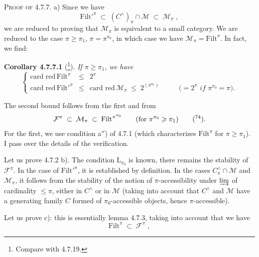 \documentclass[11pt]{article}
\newcommand{\msp}[1]{\marginpar{\footnotesize [#1]}}
\newcommand{\Filt}{\mathrm{Filt}}
\newcommand{\cardred}{\text{card red}\,}
\begin{document}
\textsc{Proof of} 4.7.7. a) Since we have
\[
\Filt'^{\pi} \;\subset\; (C^{\wedge})_{\pi} \cap \mathcal{M} \;\subset\; \mathcal{M}_{\pi} \;,
\]
we are reduced to proving that $\mathcal{M}_{\pi}$ is equivalent to a small category. We are reduced to the case $\pi \geqslant \pi_1$, $\pi = \pi^{\pi_0}$, in which case we have $\mathcal{M}_{\pi} = \Filt^{\pi}$. In fact, we find:

\textbf{Corollary 4.7.7.1} (\footnote[73]{Compare with 4.7.19.}). \textit{If $\pi \geqslant \pi_1$, we have}
\[
\left\{
\begin{array}{rcll}
\cardred \Filt^{\pi} & \leqslant & 2^{\pi} & \\[4pt]
\cardred \Filt'^{\pi} & \leqslant & \cardred \mathcal{M}_{\pi} \;\leqslant\; 2^{(\pi^{\pi_0})} & \qquad \textit{($= 2^{\pi}$ if $\pi^{\pi_0} = \pi$).}
\end{array}
\right.
\]

The second bound follows from the first and from
\[
\mathcal{F}^{\pi} \;\subset\; \mathcal{M}_{\pi} \;\subset\; \Filt^{\pi^{\pi_0}} \qquad (\text{for } \pi^{\pi_0} \geqslant \pi_1) \qquad \text{(\footnotemark[74]).}
\]
For the first, we use condition a$''$) of 4.7.1 (which characterizes $\Filt^{\pi}$ for $\pi \geqslant \pi_1$). I pass over the details of the verification.

\msp{page 174}
Let us prove 4.7.2 b). The condition $\mathrm{L}_{\pi_0}$ is known, there remains the stability of $\mathcal{F}^{\pi}$. In the case of $\Filt'^{\pi}$, it is established by definition. In the cases $C^{\wedge}_{\pi} \cap \mathcal{M}$ and $\mathcal{M}_{\pi}$, it follows from the stability of the notion of $\pi$-accessibility under $\varinjlim$ of cardinality $\leqslant \pi$, either in $C^{\wedge}$ or in $\mathcal{M}$ (taking into account that $C^{\wedge}$ and $\mathcal{M}$ have a generating family $C$ formed of $\pi_0$-accessible objects, hence $\pi$-accessible).

Let us prove c): this is essentially lemma 4.7.3, taking into account that we have
\[
\Filt^{\pi} \;\subset\; \mathcal{F}^{\pi} \;,
\]
\end{document}
